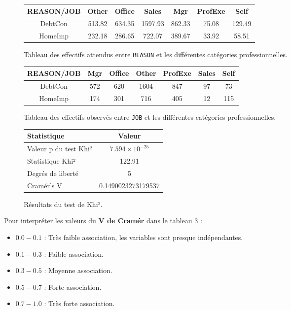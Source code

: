\documentclass[a4paper,12pt]{report}
\begin{document}
\begin{figure}[h!]
  \centering
  \begin{tabular}{|c|c|c|c|c|c|c|}
      \hline
      REASON/JOB & Other & Office & Sales & Mgr & ProfExe & Self \\
      \hline
      DebtCon & 513.82 & 634.35 & 1597.93 & 862.33 & 75.08 & 129.49 \\
      HomeImp & 232.18 & 286.65 & 722.07 & 389.67 & 33.92 & 58.51 \\
      \hline
  \end{tabular}
  \caption{Tableau des effectifs attendus entre \texttt{REASON} et les différentes catégories professionnelles.}
  \label{fig:table_khi2_reason_vs_job}
\end{figure}

\begin{figure}[h!]
  \centering
  \begin{tabular}{|c|c|c|c|c|c|c|}
      \hline
      REASON/JOB & Mgr & Office & Other & ProfExe & Sales & Self \\
      \hline
      DebtCon & 572 & 620 & 1604 & 847 & 97 & 73 \\
      HomeImp & 174 & 301 & 716 & 405 & 12 & 115 \\
      \hline
  \end{tabular}
  \caption{Tableau des effectifs observés entre \texttt{JOB} et les différentes catégories professionnelles.}
  \label{fig:table_khi2_reason_vs_job}
\end{figure}

\begin{figure}[h!]
  \centering
  \begin{tabular}{|l|c|}
      \hline
      \textbf{Statistique} & \textbf{Valeur} \\
      \hline
      Valeur p du test Khi² & $7.594 \times 10^{-25}$ \\
      Statistique Khi² & 122.91 \\
      Degrés de liberté & 5 \\
      Cramér's V & 0.1490023273179537 \\
      \hline
  \end{tabular}
  \caption{Résultats du test de Khi².}
  \label{fig:table_khi2_results_reason_vs_job}
\end{figure}

\pagebreak

Pour interpréter les valeurs du \textbf{V de Cramér} dans le tableau \ref{fig:table_khi2_results_reason_vs_job} :  
\begin{itemize}
    \item $0.0 - 0.1$ : Très faible association, les variables sont presque indépendantes.
    \item {\color{red} $0.1 - 0.3$ : Faible association.}
    \item $0.3 - 0.5$ : Moyenne association.
    \item $0.5 - 0.7$ : Forte association.
    \item $0.7 - 1.0$ : Très forte association.
\end{itemize}
\end{document}
